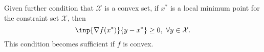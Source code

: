 \begin{theorem}
Given further condition that $\mathcal{X}$ is a convex set, if $x^*$ is a local minimum point for the constraint set $\mathcal{X}$, then
\[
\inp{\nabla f(x^*)}{y-x^*}\ge0,\ \forall y\in\mathcal{X}.
\]
This condition becomes sufficient if $f$ is convex.
\end{theorem}


























